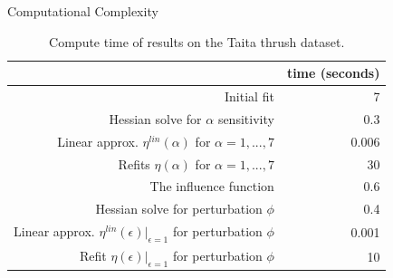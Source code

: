 \begin{frame}{Computational Complexity}

\begin{table}[tb]
\centering
\caption*{Compute time of results on the Taita thrush dataset. }
\begin{tabular}{|r|r|}
\hline
    & time (seconds) \\
    \hline
    Initial fit & 7 \\
    \hline
    Hessian solve for $\alpha$ sensitivity & 0.3\\
    Linear approx. $\eta^{lin}(\alpha)$ for $\alpha = 1, ..., 7$ &
        0.006 \\
    Refits $\eta(\alpha)$ for $\alpha = 1, ..., 7$ &
        30 \\
    \hline
    The influence function & 0.6 \\
    Hessian solve for perturbation $\phi$ &
        0.4 \\
    Linear approx. $\eta^{lin}(\epsilon)|_{\epsilon = 1}$
      for perturbation $\phi$ &
        0.001\\
    Refit $\eta(\epsilon)|_{\epsilon = 1}$
      for perturbation $\phi$ &
        10 \\
    \hline
\end{tabular}
\end{table}



\end{frame}
